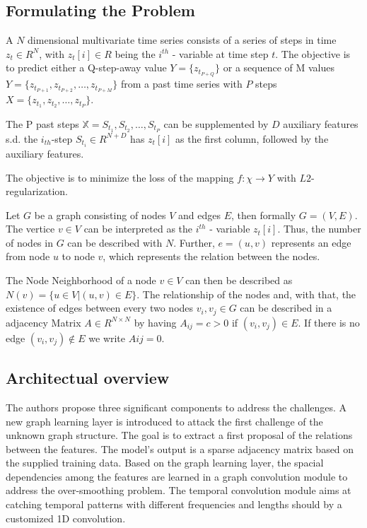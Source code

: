 \documentclass[letterpaper, twocolumn,11pt]{article}
\begin{document}
    \subsection{Formulating the Problem}
    A $N$ dimensional multivariate time series consists of a series of steps in time $z_t \in R^N$, with $z_t[i] \in R$
    being the $i^{th}$ - variable at time step $t$. The objective is to predict either a Q-step-away value
    $Y = \{z_{t_{P+Q}}\}$ or a sequence of M values $Y = \{z_{t_{P+1}}, z_{t_{P+2}},\dots,z_{t_{P+M}}\}$
    from a past time series with $P$ steps $X = \{z_{t_{1}}, z_{t_{2}},\dots,z_{t_{P}}\}$.

    The P past steps  $\mathbb{X} = {S_{t_1}, S_{t_2}, \dots, S_{t_P}}$ can be supplemented by $D$ auxiliary features s.d. the $i_{th}$-step
    $S_{t_i} \in R^{N+D}$ has $z_t[i]$ as the first column, followed by the auxiliary features.

    The objective is to minimize the loss of the mapping $f: \chi \rightarrow Y$ with $L2$-regularization.

    Let $G$ be a graph consisting of nodes $V$ and edges $E$, then formally $G=(V, E)$. The vertice $v \in V$ can be
    interpreted as the $i^{th}$ - variable $z_t[i]$. Thus, the number of nodes in $G$ can be described with $N$.
    Further, $e = (u,v)$ represents an edge from node $u$ to node $v$, which represents the relation between the nodes.

    The Node Neighborhood of a node $v \in V$ can then be described as $N(v) = \{u \in V| (u,v) \in E\}$.
    The relationship of the nodes and, with that, the existence of edges between every two nodes $v_i,v_j \in G$
    can be described in a adjacency Matrix $A \in R^{N\times N}$ by
    having  $A_{ij} = c > 0$ if $(v_i,v_j) \in E$. If there is no edge $(v_i,v_j) \notin E$ we write $Aij = 0$.

    \subsection{Architectual overview}
    The authors propose three significant components to address the challenges. A new graph learning layer
    is introduced to attack the first challenge of the unknown graph structure. The goal is to extract a first proposal of the relations between the features. The model's output is a sparse adjacency matrix based on the supplied training data.
    Based on the graph learning layer, the spacial dependencies among the features are learned in a graph convolution module to address the over-smoothing problem.
    The temporal convolution module aims at catching temporal patterns with different frequencies and lengths should by a customized 1D convolution.
\end{document}
